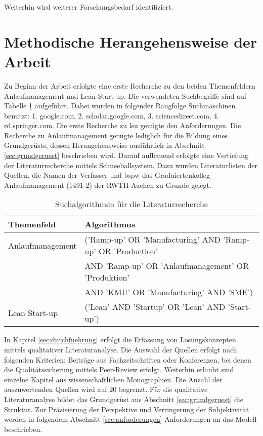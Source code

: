 Weiterhin wird weiterer Forschungsbedarf identifiziert. 

\section{Methodische Herangehensweise der Arbeit}

Zu Beginn der Arbeit erfolgte eine erste Recherche zu den beiden Themenfeldern Anlaufmanagement und Lean Start-up. Die verwendeten Suchbegriffe sind auf Tabelle \ref{tab:algorythm} aufgeführt. Dabei wurden in folgender Rangfolge Suchmaschinen benutzt: 
1. google.com, 2. scholar.google.com, 3. sciencedirect.com, 4. rd.springer.com. Die erste Recherche zu \gls{lsu} genügte den Anforderungen. Die Recherche zu Anlaufmanagement genügte lediglich für die Bildung eines Grundgerüsts, dessen Herangehensweise ausführlich in Abschnitt \ref{sec:grundgeruest} beschrieben wird. Darauf aufbauend erfolgte eine Vertiefung der Literaturrecherche mittels Schneeballsystem. Dazu wurden Literaturlisten der Quellen, die Namen der Verfasser und \gls{bspw} das Graduiertenkolleg Anlaufmanagement (1491-2) der RWTH-Aachen zu Grunde gelegt. 
\begin{table}[h]
\begin{center}
\begin{tabular}{l l}
\textbf{Themenfeld} & \textbf{Algorithmus }\\ \hline
Anlaufmanagement & ('Ramp-up' OR 'Manufacturing' AND 'Ramp-up' OR 'Production' \\ 
& AND 'Ramp-up' OR 'Anlaufmanagement' OR 'Produktion' \\
& AND 'KMU' OR 'Manufacturing' AND 'SME') \\
Lean Start-up & ('Lean' AND 'Startup' OR 'Lean' AND 'Start-up')
 \end{tabular} 
 \end{center}
\caption{Suchalgorithmen für die Literaturrecherche} \label{tab:algorythm} 
\end{table}

In Kapitel \ref{sec:durchfuehrung} erfolgt die Erfassung von Lösungskonzepten mittels qualitativer Literaturanalyse. Die Auswahl der Quellen erfolgt nach folgenden Kriterien: Beiträge aus Fachzeitschriften oder Konferenzen, bei denen die Qualitätssicherung mittels Peer-Review erfolgt. Weiterhin erlaubt sind einzelne Kapitel aus wissenschaftlichen Monographien. Die Anzahl der auszuwertenden Quellen wird auf 20 begrenzt. Für die qualitative Literaturanalyse bildet das Grundgerüst aus Abschnitt \ref{sec:grundgeruest} die Struktur. Zur Präzisierung der Perspektive und Verringerung der Subjektivität werden in folgendem Abschnitt \ref{sec:anforderungen} Anforderungen an das Modell beschrieben. 



